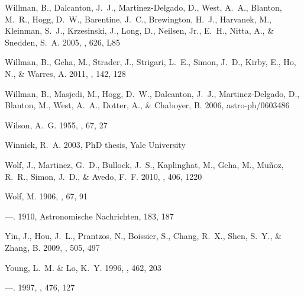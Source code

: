 \documentclass[manuscript]{aastex}
\begin{document}
\begin{thebibliography}{381}
{Willman}, B., {Dalcanton}, J.~J., {Martinez-Delgado}, D., {West}, A.~A.,
  {Blanton}, M.~R., {Hogg}, D.~W., {Barentine}, J.~C., {Brewington}, H.~J.,
  {Harvanek}, M., {Kleinman}, S.~J., {Krzesinski}, J., {Long}, D., {Neilsen},
  Jr., E.~H., {Nitta}, A., \& {Snedden}, S.~A. 2005{}, \apjl, 626,
  L85

{Willman}, B., {Geha}, M., {Strader}, J., {Strigari}, L.~E., {Simon}, J.~D.,
  {Kirby}, E., {Ho}, N., \& {Warres}, A. 2011, \aj, 142, 128

{Willman}, B., {Masjedi}, M., {Hogg}, D.~W., {Dalcanton}, J.~J.,
  {Martinez-Delgado}, D., {Blanton}, M., {West}, A.~A., {Dotter}, A., \&
  {Chaboyer}, B. 2006, astro-ph/0603486

{Wilson}, A.~G. 1955, \pasp, 67, 27

{Winnick}, R.~A. 2003, PhD thesis, Yale University

{Wolf}, J., {Martinez}, G.~D., {Bullock}, J.~S., {Kaplinghat}, M., {Geha}, M.,
  {Mu{\~n}oz}, R.~R., {Simon}, J.~D., \& {Avedo}, F.~F. 2010, \mnras, 406, 1220

{Wolf}, M. 1906, \mnras, 67, 91

---. 1910, Astronomische Nachrichten, 183, 187

{Yin}, J., {Hou}, J.~L., {Prantzos}, N., {Boissier}, S., {Chang}, R.~X.,
  {Shen}, S.~Y., \& {Zhang}, B. 2009, \aap, 505, 497

{Young}, L.~M. \& {Lo}, K.~Y. 1996, \apj, 462, 203

---. 1997{}, \apj, 476, 127


\end{thebibliography}
\end{document}
